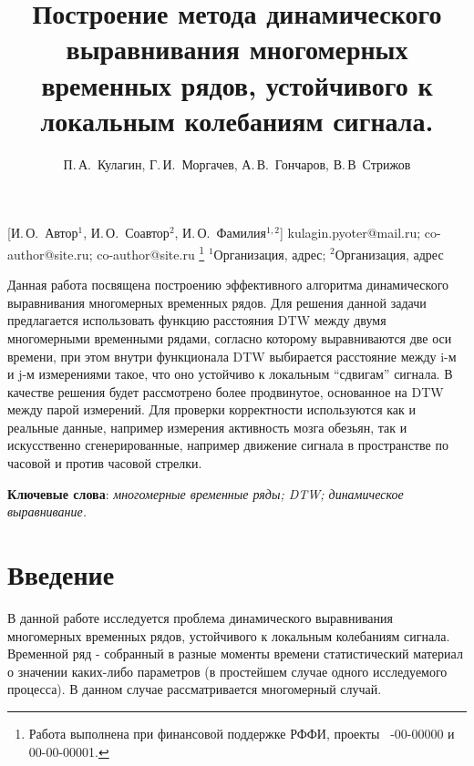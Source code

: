 \documentclass[12pt, twoside]{article}
\begin{document}

\title
    [Шаблон статьи для публикации] %
    {Построение метода динамического выравнивания многомерных временных рядов, устойчивого к локальным колебаниям сигнала.}
\author
    [И.\,О.~Автор] %
    {П.\,А.~Кулагин, Г.\,И.~Моргачев, А.\,В.~Гончаров, В.\,В~Стрижов} %
    [И.\,О.~Автор$^1$, И.\,О.~Соавтор$^2$, И.\,О.~Фамилия$^{1,2}$] %
\email
    {kulagin.pyoter@mail.ru; co-author@site.ru;  co-author@site.ru}
\thanks
    {Работа выполнена при
     финансовой поддержке РФФИ, проекты \No\ -00-00000 и 00-00-00001.}
\organization
    {$^1$Организация, адрес; $^2$Организация, адрес}
\abstract
    {Данная работа посвящена построению эффективного алгоритма динамического выравнивания многомерных временных рядов. Для решения данной задачи предлагается использовать функцию расстояния DTW между двумя многомерными временными рядами, согласно которому выравниваются две оси времени, при этом внутри функционала DTW выбирается расстояние между i-м и j-м измерениями такое, что оно устойчиво к локальным “сдвигам” сигнала. В качестве решения будет рассмотрено более продвинутое, основанное на DTW между парой измерений. Для проверки корректности используются как и реальные данные, например измерения активность мозга обезьян, так и искусственно сгенерированные, например движение сигнала в пространстве по часовой и против часовой стрелки.
	
\bigskip
\noindent
\textbf{Ключевые слова}: \emph {многомерные временные ряды; DTW; динамическое выравнивание.}
}

\maketitle
\linenumbers

\section{Введение}

В данной работе исследуется проблема динамического выравнивания многомерных временных рядов, устойчивого к локальным колебаниям сигнала.
Временной ряд -  собранный в разные моменты времени статистический материал о значении каких-либо параметров (в простейшем случае одного исследуемого процесса). В данном случае рассматривается многомерный случай.
\end{document}
